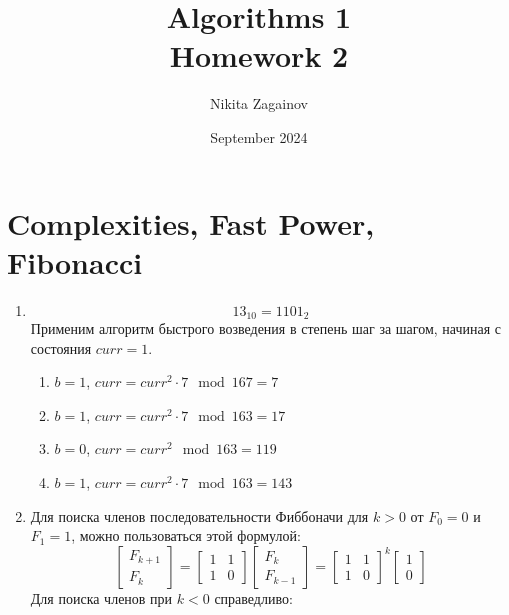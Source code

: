 \documentclass{article}
\title{Algorithms 1 \\ Homework 2}
\author{Nikita Zagainov}
\date{September 2024}
\begin{document}
\maketitle
\section{Complexities, Fast Power, Fibonacci}
\begin{enumerate}
    \item
          \[
              13_{10} = 1101_{2}
          \]
          Применим алгоритм быстрого возведения в степень шаг за шагом, начиная с состояния $curr = 1$.
          \begin{enumerate}
              \item[1.] $b = 1$, $curr = curr^2 \cdot 7 \mod 167 = 7$
              \item[2.] $b = 1$, $curr = curr^2 \cdot 7 \mod 163 = 17$
              \item[3.] $b = 0$, $curr = curr^2 \mod 163 = 119$
              \item[4.] $b = 1$, $curr = curr^2 \cdot 7 \mod 163 = 143$
          \end{enumerate}
    \item Для поиска членов последовательности Фиббоначи для $k > 0$ от $F_0 = 0$ и $F_1 = 1$, можно пользоваться этой формулой:
          \[
              \begin{bmatrix}
                  F_{k+1} \\
                  F_{k}
              \end{bmatrix}
              =
              \begin{bmatrix}
                  1 & 1 \\
                  1 & 0
              \end{bmatrix}
              \begin{bmatrix}
                  F_{k} \\
                  F_{k-1}
              \end{bmatrix}
              =
              \begin{bmatrix}
                  1 & 1 \\
                  1 & 0
              \end{bmatrix}^k
              \begin{bmatrix}
                  1 \\
                  0
              \end{bmatrix}
          \]
          Для поиска членов при $k < 0$ справедливо:

\end{enumerate}
\end{document}
